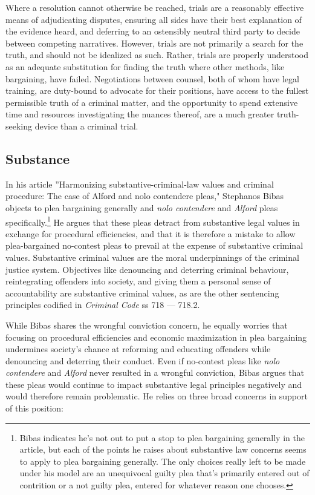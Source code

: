 Where a resolution cannot otherwise be reached, trials are a reasonably effective means of adjudicating disputes, ensuring all sides have their best explanation of the evidence heard, and deferring to an ostensibly neutral third party to decide between competing narratives. However, trials are not primarily a search for the truth, and should not be idealized as such. Rather, trials are properly understood as an adequate substitution for finding the truth where other methods, like bargaining, have failed. Negotiations between counsel, both of whom have legal training, are duty-bound to advocate for their positions, have access to the fullest permissible truth of a criminal matter, and the opportunity to spend extensive time and resources investigating the nuances thereof, are a much greater truth-seeking device than a criminal trial.


\subsection{Substance}

In his article ''Harmonizing substantive-criminal-law values and criminal procedure: The case of Alford and nolo contendere pleas," Stephanos Bibas objects to plea bargaining generally and \textit{nolo contendere} and \textit{Alford} pleas specifically.\footnote{Bibas indicates he's not out to put a stop to plea bargaining generally in the article, but each of the points he raises about substantive law concerns seems to apply to plea bargaining generally. The only choices really left to be made under his model are an unequivocal guilty plea that's primarily entered out of contrition or a not guilty plea, entered for whatever reason one chooses.} He argues that these pleas detract from substantive legal values in exchange for procedural efficiencies, and that it is therefore a mistake to allow plea-bargained no-contest pleas to prevail at the expense of substantive criminal values. Substantive criminal values are the moral underpinnings of the criminal justice system. Objectives like denouncing and deterring criminal behaviour, reintegrating offenders into society, and giving them a personal sense of accountability are substantive criminal values, as are the other sentencing principles codified in \textit{Criminal Code} ss 718 — 718.2.

While Bibas shares the wrongful conviction concern, he equally worries that focusing on procedural efficiencies and economic maximization in plea bargaining undermines society's chance at reforming and educating offenders while denouncing and deterring their conduct. Even if no-contest pleas like \textit{nolo contendere} and \textit{Alford} never resulted in a wrongful conviction, Bibas argues that these pleas would continue to impact substantive legal principles negatively and would therefore remain problematic. He relies on three broad concerns in support of this position:

